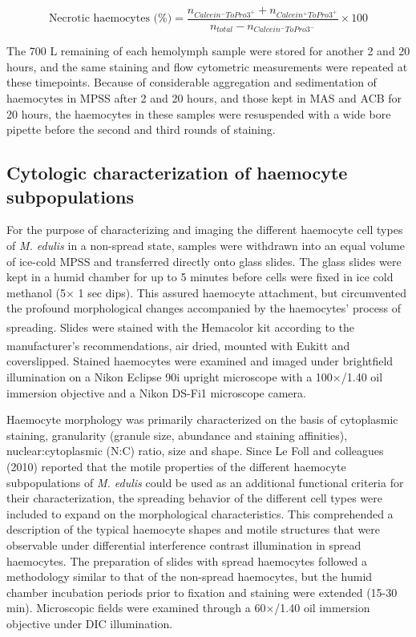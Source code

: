 \begin{equation}
    \label{eq:necrotic hemocytes}
    \text{Necrotic haemocytes (\%)} = \dfrac{n_{Calcein^{-}ToPro3^{+}} + n_{Calcein^{+}ToPro3^{+}}}{n_{total} - n_{Calcein^{-}ToPro3^{-}}} \times 100
\end{equation}

The 700 \micro L remaining of each hemolymph sample were stored for another 2 and 20 hours, and the same staining and flow cytometric measurements were repeated at these timepoints. Because of considerable aggregation and sedimentation of haemocytes in MPSS after 2 and 20 hours, and those kept in MAS and ACB for 20 hours, the haemocytes in these samples were resuspended with a wide bore pipette before the second and third rounds of staining.

\subsection{Cytologic characterization of haemocyte subpopulations}
\label{subsection:morph}
For the purpose of characterizing and imaging the different haemocyte cell types of \emph{M. edulis} in a non-spread state, samples were withdrawn into an equal volume of ice-cold MPSS and transferred directly onto glass slides. The glass slides were kept in a humid chamber for up to 5 minutes before cells were fixed in ice cold methanol (5$\times$ 1 sec dips). This assured haemocyte attachment, but circumvented the profound morphological changes accompanied by the haemocytes’ process of spreading. Slides were stained with the Hemacolor\textsuperscript{\textregistered} kit according to the manufacturer’s recommendations, air dried, mounted with Eukitt\textsuperscript{\textregistered} and coverslipped. Stained haemocytes were examined and imaged under brightfield illumination on a Nikon Eclipse 90i upright microscope with a 100$\times$/1.40 oil immersion objective and a Nikon DS-Fi1 microscope camera.

Haemocyte morphology was primarily characterized on the basis of cytoplasmic staining, granularity (granule size, abundance and staining affinities), nuclear:cytoplasmic (N:C) ratio, size and shape. Since Le Foll and colleagues (2010) reported that the motile properties of the different haemocyte subpopulations of \emph{M. edulis} could be used as an additional functional criteria for their characterization, the spreading behavior of the different cell types were included to expand on the morphological characteristics. This comprehended a description of the typical haemocyte shapes and motile structures that were observable under differential interference contrast illumination in spread haemocytes. The preparation of slides with spread haemocytes followed a methodology similar to that of the non-spread haemocytes, but the humid chamber incubation periods prior to fixation and staining were extended (15-30 min). Microscopic fields were examined through a 60$\times$/1.40 oil immersion objective under DIC illumination.

